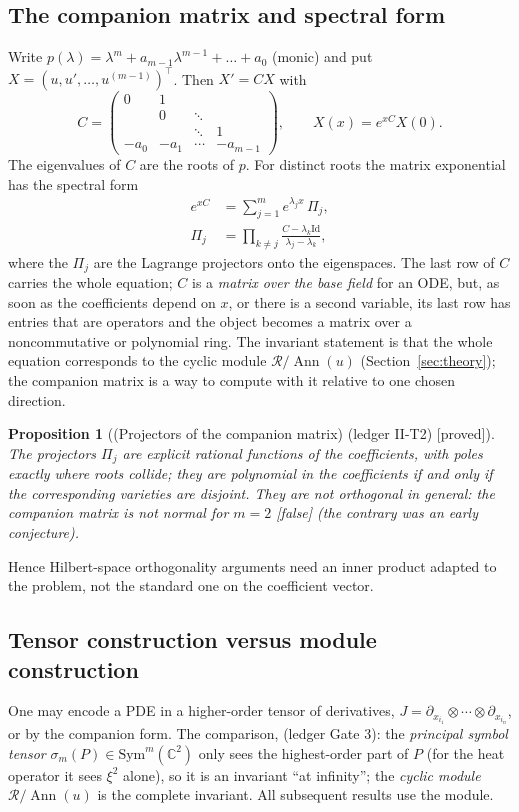\documentclass[11pt]{article}
\theoremstyle{plain}
\newtheorem{proposition}[theorem]{Proposition}
\theoremstyle{definition}
\theoremstyle{remark}
\newcommand{\C}{\mathbb{C}}
\newcommand{\ring}{\mathcal{R}}            %
\DeclareMathOperator{\Ann}{Ann}             %
\newcommand{\Id}{\mathrm{Id}}
\newcommand{\badge}[2]{\textcolor{#1}{\textsf{\footnotesize[#2]}}}
\newcommand{\proved}[1][]{\badge{cC}{proved#1}}
\newcommand{\falsest}{\badge{cB}{false}}
\newcommand{\led}[1]{\textcolor{cG}{\textsf{\footnotesize(ledger #1)}}}
\begin{document}
\subsection{The companion matrix and spectral form}
Write $p(\lambda)=\lambda^m+a_{m-1}\lambda^{m-1}+\dots+a_0$ (monic) and put $X=(u,u',\dots,u^{(m-1)})^{\top}$. Then $X'=CX$ with
\[
C=\begin{pmatrix}0&1&&\\&0&\ddots&\\&&\ddots&1\\-a_0&-a_1&\cdots&-a_{m-1}\end{pmatrix},\qquad
X(x)=e^{xC}X(0).
\]
The eigenvalues of $C$ are the roots of $p$. For distinct roots the matrix exponential has the spectral form
\begin{equation}\label{eq:spectral}
\begin{aligned}
e^{xC}&=\sum_{j=1}^me^{\lambda_jx}\,\Pi_j,\\
\Pi_j&=\prod_{k\ne j}\frac{C-\lambda_k\Id}{\lambda_j-\lambda_k},
\end{aligned}
\end{equation}
where the $\Pi_j$ are the Lagrange projectors onto the eigenspaces. The last row of $C$ carries the whole equation; $C$ is a \emph{matrix over the base field} for an ODE, but, as soon as the coefficients depend on $x$, or there is a second variable, its last row has entries that are operators and the object becomes a matrix over a noncommutative or polynomial ring. The invariant statement is that the whole equation corresponds to the cyclic module $\ring/\Ann(u)$ (Section~\ref{sec:theory}); the companion matrix is a way to compute with it relative to one chosen direction.

\begin{proposition}[{(Projectors of the companion matrix) \led{II-T2} \proved[]}]
The projectors $\Pi_j$ are explicit rational functions of the coefficients, with poles exactly where roots collide; they are polynomial in the coefficients if and only if the corresponding varieties are disjoint. They are \emph{not} orthogonal in general: the companion matrix is not normal for $m=2$ \falsest{} (the contrary was an early conjecture).
\end{proposition}
Hence Hilbert-space orthogonality arguments need an inner product adapted to the problem, not the standard one on the coefficient vector.

\subsection{Tensor construction versus module construction}
One may encode a PDE in a higher-order tensor of derivatives, $J=\partial_{x_{i_1}}\otimes\cdots\otimes\partial_{x_{i_n}}$, or by the companion form. The comparison, \led{Gate 3}: the \emph{principal symbol tensor} $\sigma_m(P)\in\mathrm{Sym}^m(\C^2)$ only sees the highest-order part of $P$ (for the heat operator it sees $\xi^2$ alone), so it is an invariant ``at infinity''; the \emph{cyclic module} $\ring/\Ann(u)$ is the complete invariant. All subsequent results use the module.
\end{document}
